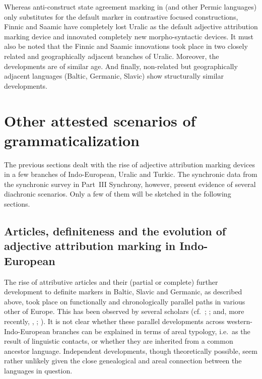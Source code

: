 {Whereas anti\hyp{}construct state agreement marking in  (and other Permic languages) only substitutes for the default marker in contrastive focused constructions, Finnic and Saamic have completely lost Uralic  as the default adjective attribution marking device and innovated completely new morpho-syntactic devices. It must also be noted that the Finnic and Saamic innovations took place in two closely related and geographically adjacent branches of Uralic. Moreover, the developments are of similar age. And finally, non-related but geographically adjacent languages (Baltic, Germanic, Slavic) show structurally similar developments.

\section{Other attested scenarios of grammaticalization}
The previous sections dealt with the rise of adjective attribution marking devices in a few branches of Indo-European, Uralic and Turkic. The synchronic data from the synchronic survey in Part~III Synchrony, however, present evidence of several diachronic scenarios. Only a few of them will be sketched in the following sections.

\subsection[Articles, definiteness and adjective attribution]{Articles, definiteness and the evolution of adjective attribution marking in Indo-European}
The rise of attributive articles and their (partial or complete) further development to definite markers in Baltic, Slavic and Germanic, as described above, took place on functionally and chronologically parallel paths in various other  of Europe. This has been observed by several scholars (cf.~\citealt{brugmann-etal1916}; \citealt{gamillscheg1937}; \citealt{heinrichs1954} and, more recently, \citealt{nocentini1996}, \citealt{philippi1997}; \citealt{himmelmann1997}). It is not clear whether these parallel developments across western-Indo-European branches can be explained in terms of areal typology, i.e.~as the result of linguistic contacts, or whether they are inherited from a common ancestor language. Independent developments, though theoretically possible, seem rather unlikely given the close genealogical and areal connection between the languages in question.

}

